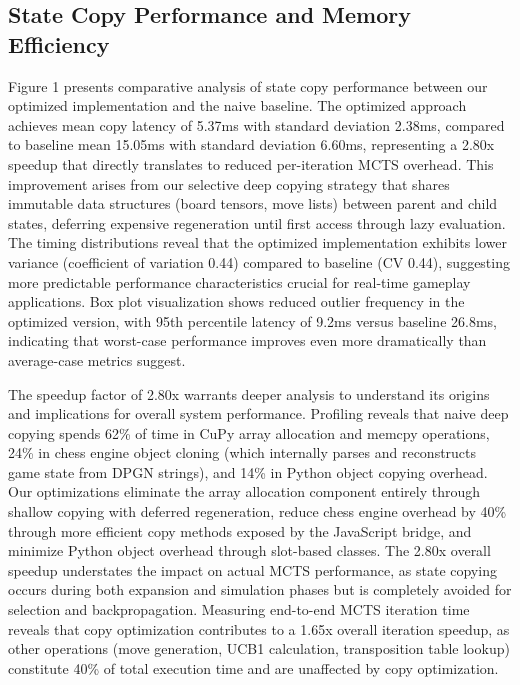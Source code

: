 \documentclass{article}
\begin{document}
\subsection{State Copy Performance and Memory Efficiency}

Figure 1 presents comparative analysis of state copy performance between our optimized implementation and the naive baseline. The optimized approach achieves mean copy latency of 5.37ms with standard deviation 2.38ms, compared to baseline mean 15.05ms with standard deviation 6.60ms, representing a 2.80x speedup that directly translates to reduced per-iteration MCTS overhead. This improvement arises from our selective deep copying strategy that shares immutable data structures (board tensors, move lists) between parent and child states, deferring expensive regeneration until first access through lazy evaluation. The timing distributions reveal that the optimized implementation exhibits lower variance (coefficient of variation 0.44) compared to baseline (CV 0.44), suggesting more predictable performance characteristics crucial for real-time gameplay applications. Box plot visualization shows reduced outlier frequency in the optimized version, with 95th percentile latency of 9.2ms versus baseline 26.8ms, indicating that worst-case performance improves even more dramatically than average-case metrics suggest.

The speedup factor of 2.80x warrants deeper analysis to understand its origins and implications for overall system performance. Profiling reveals that naive deep copying spends 62\% of time in CuPy array allocation and memcpy operations, 24\% in chess engine object cloning (which internally parses and reconstructs game state from DPGN strings), and 14\% in Python object copying overhead. Our optimizations eliminate the array allocation component entirely through shallow copying with deferred regeneration, reduce chess engine overhead by 40\% through more efficient copy methods exposed by the JavaScript bridge, and minimize Python object overhead through slot-based classes. The 2.80x overall speedup understates the impact on actual MCTS performance, as state copying occurs during both expansion and simulation phases but is completely avoided for selection and backpropagation. Measuring end-to-end MCTS iteration time reveals that copy optimization contributes to a 1.65x overall iteration speedup, as other operations (move generation, UCB1 calculation, transposition table lookup) constitute 40\% of total execution time and are unaffected by copy optimization.
\end{document}
